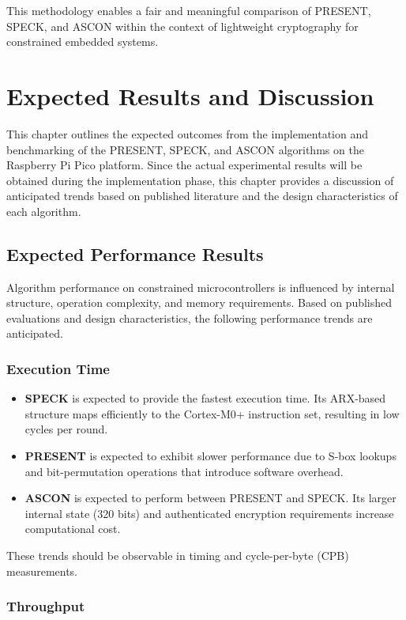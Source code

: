 \documentclass[12pt]{report}
\begin{document}
This methodology enables a fair and meaningful comparison of PRESENT, SPECK, and ASCON
within the context of lightweight cryptography for constrained embedded systems.

\chapter{Expected Results and Discussion}

This chapter outlines the expected outcomes from the implementation and benchmarking of the PRESENT, SPECK, and ASCON algorithms on the Raspberry Pi Pico platform. Since the actual experimental results will be obtained during the implementation phase, this chapter provides a discussion of anticipated trends based on published literature and the design characteristics of each algorithm.

\section{Expected Performance Results}

Algorithm performance on constrained microcontrollers is influenced by internal structure, operation complexity, and memory requirements. Based on published evaluations and design characteristics, the following performance trends are anticipated.

\subsection{Execution Time}

\begin{itemize}
    \item \textbf{SPECK} is expected to provide the fastest execution time. Its ARX-based structure maps efficiently to the Cortex-M0+ instruction set, resulting in low cycles per round.
    \item \textbf{PRESENT} is expected to exhibit slower performance due to S-box lookups and bit-permutation operations that introduce software overhead.
    \item \textbf{ASCON} is expected to perform between PRESENT and SPECK. Its larger internal state (320 bits) and authenticated encryption requirements increase computational cost.
\end{itemize}

These trends should be observable in timing and cycle-per-byte (CPB) measurements.

\subsection{Throughput}
\end{document}
